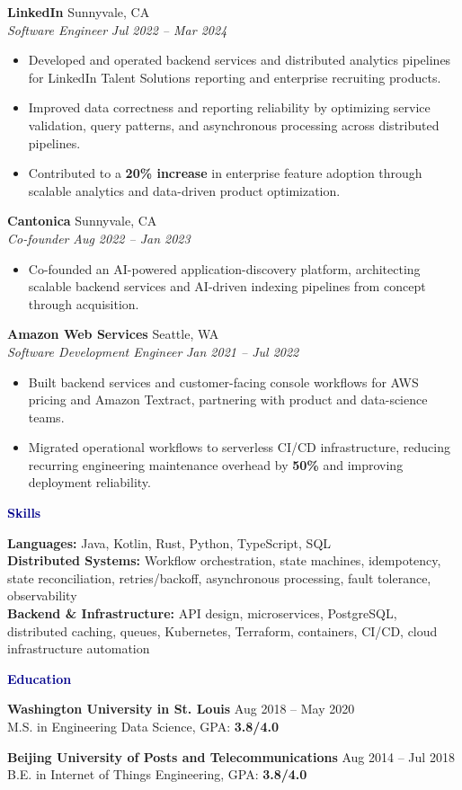 \documentclass[letterpaper,10pt]{article}
\newcommand{\sectionheader}[1]{%
  \vspace{0.45em}
  \noindent\textbf{\textcolor{darkblue}{#1}}\hspace{0.5em}\hrulefill
  \vspace{0.25em}
}
\newcommand{\jobentry}[4]{%
  \textbf{#1} \hfill #2\\[-0.15em]
  \textit{#3} \hfill \textit{#4}
}
\begin{document}
\jobentry{LinkedIn}{Sunnyvale, CA}{Software Engineer}{Jul 2022 -- Mar 2024}
\begin{itemize}
  \item Developed and operated backend services and distributed analytics pipelines for LinkedIn Talent Solutions reporting and enterprise recruiting products.
  \item Improved data correctness and reporting reliability by optimizing service validation, query patterns, and asynchronous processing across distributed pipelines.
  \item Contributed to a \textbf{20\% increase} in enterprise feature adoption through scalable analytics and data-driven product optimization.
\end{itemize}

\jobentry{Cantonica}{Sunnyvale, CA}{Co-founder}{Aug 2022 -- Jan 2023}
\begin{itemize}
  \item Co-founded an AI-powered application-discovery platform, architecting scalable backend services and AI-driven indexing pipelines from concept through acquisition.
\end{itemize}

\jobentry{Amazon Web Services}{Seattle, WA}{Software Development Engineer}{Jan 2021 -- Jul 2022}
\begin{itemize}
  \item Built backend services and customer-facing console workflows for AWS pricing and Amazon Textract, partnering with product and data-science teams.
  \item Migrated operational workflows to serverless CI/CD infrastructure, reducing recurring engineering maintenance overhead by \textbf{50\%} and improving deployment reliability.
\end{itemize}

\sectionheader{Skills}

\textbf{Languages:} Java, Kotlin, Rust, Python, TypeScript, SQL\\
\textbf{Distributed Systems:} Workflow orchestration, state machines, idempotency, state reconciliation, retries/backoff, asynchronous processing, fault tolerance, observability\\
\textbf{Backend \& Infrastructure:} API design, microservices, PostgreSQL, distributed caching, queues, Kubernetes, Terraform, containers, CI/CD, cloud infrastructure automation

\sectionheader{Education}

\textbf{Washington University in St. Louis} \hfill Aug 2018 -- May 2020\\[-0.1em]
M.S. in Engineering Data Science, GPA: \textbf{3.8/4.0}

\textbf{Beijing University of Posts and Telecommunications} \hfill Aug 2014 -- Jul 2018\\[-0.1em]
B.E. in Internet of Things Engineering, GPA: \textbf{3.8/4.0}
\end{document}
